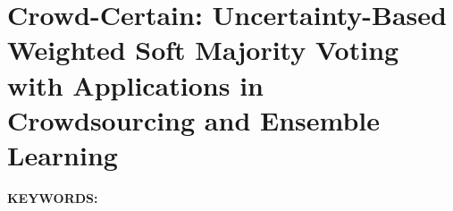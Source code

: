 \renewcommand{\chapterpath}[1]{Chapters/crowd/#1}
\renewcommand{\figurepath}[1]{Chapters/crowd/figures/#1}
% 

\chapter{Crowd-Certain: Uncertainty-Based Weighted Soft Majority Voting with Applications in Crowdsourcing and Ensemble Learning}\label{ch:crowd}
\textbf{KEYWORDS:\ } %

\newpage


